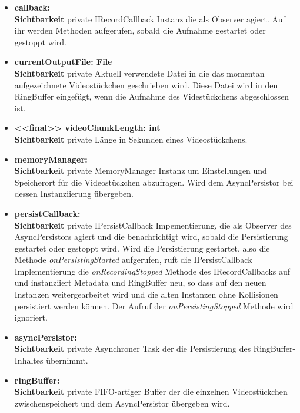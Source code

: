 \begin{itemize}
\item \textbf{callback: } \hfill\\ 
\textbf{Sichtbarkeit} private \newline
IRecordCallback Instanz die als Observer agiert. Auf ihr werden Methoden aufgerufen, sobald die Aufnahme gestartet oder gestoppt wird.

\item \textbf{currentOutputFile: File} \hfill\\ 
\textbf{Sichtbarkeit} private \newline
Aktuell verwendete Datei in die das momentan aufgezeichnete Videostückchen geschrieben wird. Diese Datei wird in den RingBuffer eingefügt, wenn die Aufnahme des Videstückchens abgeschlossen ist.

\item \textbf{<<final>> videoChunkLength: int} \hfill\\ 
\textbf{Sichtbarkeit} private \newline
Länge in Sekunden eines Videostückchens.

\item \textbf{memoryManager: } \hfill\\ 
\textbf{Sichtbarkeit} private \newline
MemoryManager Instanz um Einstellungen und Speicherort für die Videostückchen abzufragen. Wird dem AsyncPersistor bei dessen Instanziierung übergeben.

\item \textbf{persistCallback: } \hfill\\ 
\textbf{Sichtbarkeit} private \newline
IPersistCallback Impementierung, die als Observer des AsyncPersistors agiert und die benachrichtigt wird, sobald die Persistierung gestartet oder gestoppt wird. Wird die Persistierung gestartet, also die Methode \textit{onPersistingStarted} aufgerufen, ruft die IPersistCallback Implementierung die \textit{onRecordingStopped} Methode des IRecordCallbacks auf und instanziiert Metadata und RingBuffer neu, so dass auf den neuen Instanzen weitergearbeitet wird und die alten Instanzen ohne Kollisionen persistiert werden können. Der Aufruf der \textit{onPersistingStopped} Methode wird ignoriert.

\item \textbf{asyncPersistor: } \hfill\\ 
\textbf{Sichtbarkeit} private \newline
Asynchroner Task der die Persistierung des RingBuffer-Inhaltes übernimmt.

\item \textbf{ringBuffer: } \hfill\\ 
\textbf{Sichtbarkeit} private \newline
FIFO-artiger Buffer der die einzelnen Videostückchen zwischenspeichert und dem AsyncPersistor übergeben wird.

\end{itemize}


